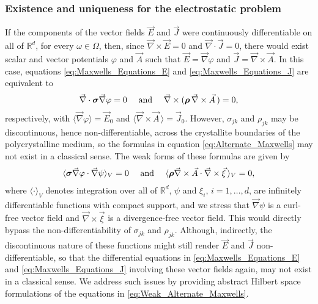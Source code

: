 \documentclass[11pt]{amsart}
\newcommand\bsig{\mbox{\boldmath${\sigma}$}}
\newcommand\brho{\mbox{\boldmath${\rho}$}}
\begin{document}
\subsubsection{Existence and uniqueness for the electrostatic problem}
\label{sec:Existence_and_Uniqueness}
%
If the components of the vector fields $\vec{E}$ and $\vec{J}$ were
continuously differentiable on all of $\mathbb{R}^d$, for every $\omega\in\Omega$,
then, since $\vec{\nabla}\times\vec{E}=0$ and $\vec{\nabla}\cdot\vec{J}=0$,
there would exist \cite{Jackson-1999} scalar and
vector potentials $\varphi$ and $\vec{A}$ such that
$\vec{E}=\vec{\nabla}\varphi$ and $\vec{J}=\vec{\nabla}\times\vec{A}$. In this case, equations
\eqref{eq:Maxwells_Equations_E} and \eqref{eq:Maxwells_Equations_J}
are equivalent to
%
\begin{align}\label{eq:Alternate_Maxwells}  
  \vec{\nabla}\cdot\bsig\vec{\nabla}\varphi=0
  \quad \text{ and } \quad
  \vec{\nabla}\times(\brho\,\vec{\nabla}\times\vec{A}\,)=0,
\end{align}
%
respectively, with $\langle\vec{\nabla}\varphi\rangle=\vec{E}_0$ and
$\langle\vec{\nabla}\times\vec{A}\,\rangle=\vec{J}_0$. However, $\sigma_{jk}$ and $\rho_{jk}$ may
be discontinuous, hence non-differentiable, across the crystallite
boundaries of the polycrystalline medium, so the formulas in equation
\eqref{eq:Alternate_Maxwells} may not exist in a classical sense. The
weak forms \cite{Folland:95} of these formulas are given by
%
\begin{align}\label{eq:Weak_Alternate_Maxwells}
  \langle\bsig\vec{\nabla}\varphi\cdot\vec{\nabla}\psi\rangle_V=0
  \quad \text{ and } \quad
  \langle\brho\vec{\nabla}\times\vec{A}\cdot\vec{\nabla}\times\vec{\xi}\,\rangle_V=0,
\end{align}
%
where $\langle\cdot\rangle_V$ denotes
integration over all of $\mathbb{R}^d$, $\psi$ and $\xi_i$, $i=1,\ldots,d$,
are infinitely differentiable functions with compact support, and we
stress that $\vec{\nabla}\psi$ is a curl-free vector field and
$\vec{\nabla}\times\vec{\xi}$ is a divergence-free vector field. This 
would directly bypass the non-differentiability of $\sigma_{jk}$ and
$\rho_{jk}$. Although, indirectly, the discontinuous nature of these 
functions might still render $\vec{E}$ and $\vec{J}$
non-differentiable, so that the differential equations in
\eqref{eq:Maxwells_Equations_E} and \eqref{eq:Maxwells_Equations_J}
involving these vector fields again, may not exist in a classical
sense.  We address such issues by providing abstract Hilbert space
formulations \cite{Golden:CMP-473} of the equations 
in \eqref{eq:Weak_Alternate_Maxwells}.  
\end{document}
